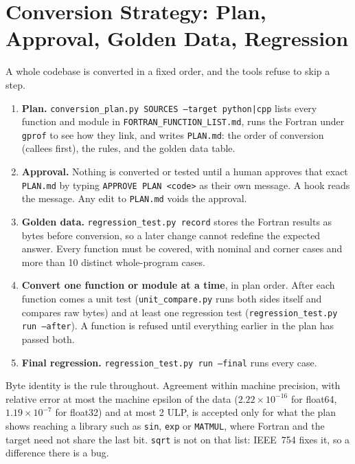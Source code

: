 \documentclass[11pt,a4paper]{article}
\theoremstyle{definition}
\begin{document}
\section{Conversion Strategy: Plan, Approval, Golden Data, Regression}

A whole codebase is converted in a fixed order, and the tools refuse to skip a step.

\begin{enumerate}
    \item \textbf{Plan.} \texttt{conversion\_plan.py SOURCES --target python|cpp} lists every function and module in \texttt{FORTRAN\_FUNCTION\_LIST.md}, runs the Fortran under \texttt{gprof} to see how they link, and writes \texttt{PLAN.md}: the order of conversion (callees first), the rules, and the golden data table.
    \item \textbf{Approval.} Nothing is converted or tested until a human approves that exact \texttt{PLAN.md} by typing \texttt{APPROVE PLAN <code>} as their own message. A hook reads the message. Any edit to \texttt{PLAN.md} voids the approval.
    \item \textbf{Golden data.} \texttt{regression\_test.py record} stores the Fortran results as bytes before conversion, so a later change cannot redefine the expected answer. Every function must be covered, with nominal and corner cases and more than 10 distinct whole-program cases.
    \item \textbf{Convert one function or module at a time}, in plan order. After each function comes a unit test (\texttt{unit\_compare.py} runs both sides itself and compares raw bytes) and at least one regression test (\texttt{regression\_test.py run --after}). A function is refused until everything earlier in the plan has passed both.
    \item \textbf{Final regression.} \texttt{regression\_test.py run --final} runs every case.
\end{enumerate}

Byte identity is the rule throughout. Agreement within machine precision, with relative error at most the machine epsilon of the data ($2.22\times10^{-16}$ for float64, $1.19\times10^{-7}$ for float32) and at most 2 ULP, is accepted only for what the plan shows reaching a library such as \texttt{sin}, \texttt{exp} or \texttt{MATMUL}, where Fortran and the target need not share the last bit. \texttt{sqrt} is not on that list: IEEE~754 fixes it, so a difference there is a bug.
\end{document}
